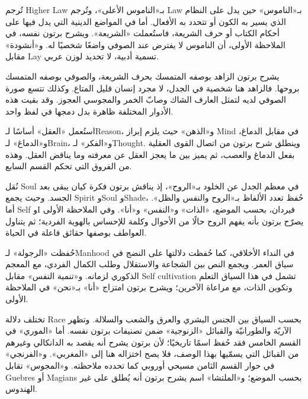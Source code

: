 

تُرجم \textenglish{Higher Law} بـ«الناموس الأعلى»، وتُرجم \textenglish{Law} بـ«الناموس» حين يدل على النظام الذي يسير به الكون أو تتحدد به الأفعال. أما في المواضع الدينية التي يدل فيها على أحكام الكتاب أو حرف الشريعة، فاستُعملت «الشريعة». ويشرح برتون نفسه، في الملاحظة الأولى، أن الناموس لا يفترض عند الصوفي واضعًا شخصيًا له. و«أنشودة» مقابل \textenglish{Lay} تسمية أدبية، لا تحديد لوزن عربي.


يشرح برتون الزاهد بوصفه المتمسك بحرف الشريعة، والصوفي بوصفه المتمسك بروحها. فالزاهد هنا شخصية في الجدل، لا مجرد إنسان قليل المتاع. وكذلك تتسع صورة الصوفي لديه لتمثل العارف الشاك وصابّ الخمر والمجوسي العجوز. وقد بقيت هذه الأدوار المختلفة ظاهرة بدل دمجها في لفظ واحد.


استُعمل «العقل» أساسًا لـ\textenglish{Reason}، و«الذهن» حيث يلزم إبراز \textenglish{Mind} في مقابل الدماغ، و«الدماغ» لـ\textenglish{Brain}، و«الفكر» لـ\textenglish{Thought}. وينطلق شرح برتون من اتصال القوى العقلية بفعل الدماغ والعصب، ثم يميز بين ما يعجز العقل عن معرفته وما يناقض العقل. وهذه من الفروق التي تحكم القسم السابع.


نُقل \textenglish{Soul} في معظم الجدل عن الخلود بـ«الروح»، إذ يناقش برتون فكرة كيان يبقى بعد الجسد. وحيث يجمع \textenglish{Spirit} و\textenglish{Soul} و\textenglish{Shade}، حُفظ تعدد الألفاظ بـ«الروح والنفس والظل». أما \textenglish{Self} و\textenglish{I} فيردان، بحسب الموضع، «الذات» و«النفس» و«أنا». وفي الملاحظة الأولى يصرّح برتون بأنه يفهم الروح حالًا من الأحوال وكلمة للإحساس بالهوية الفردية؛ ثم يتناول العواطف بوصفها حقائق فاعلة في الحياة.


حُفظت «الرجولة» لـ\textenglish{Manhood} في النداء الأخلاقي، كما حُفظت دلالتها على النضج في سياق العمر. ويجمع النص بين الشجاعة والاستقلال وطلب الكمال الفردي، مع المعجم الذكوري لزمانه. و«تنمية النفس» مقابل \textenglish{Self cultivation} تشمل في هذا السياق التعلم وتكوين الذات، مع مراعاة الآخرين؛ ويشرح برتون امتزاج «أنا» بـ«نحن» في الملاحظة الأولى.


تختلف دلالة \textenglish{Race} بحسب السياق بين الجنس البشري والعرق والشعب والسلالة. وتظهر الآريّة والطورانيّة والقبائل «الزنوجية» ضمن تصنيفات برتون نفسه. أما «الموري» في القسم الخامس فقد حُفظ اسمًا تاريخيًا؛ لأن برتون يشرح أنه يقصد به الدانكالي وغيرهم من القبائل التي يسمّيها بهذا الوصف، فلا يصح اختزاله هنا إلى «المغربي». و«الفرنجي» في حوار القسم الثامن مسيحي أوروبي كما تحدده ملاحظته. و«المجوس» تقابل \textenglish{Guebres} أو \textenglish{Magians} بحسب الموضع؛ و«الملتشا» اسم يشرح برتون أنه يُطلق على غير الهندوس.

